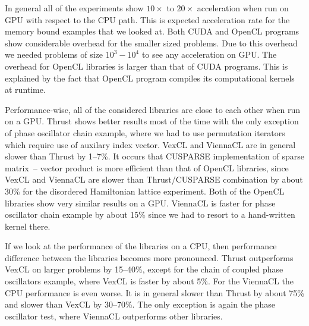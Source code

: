 \documentclass[1p]{elsarticle}
\begin{document}
In general all of the experiments show $10\times$ to $20\times$ acceleration
when run on GPU with respect to the CPU path. This is expected acceleration
rate for the memory bound examples that we looked at. Both CUDA and OpenCL
programs show considerable overhead for the smaller sized problems.  Due to
this overhead we needed problems of size $10^3-10^4$ to see any acceleration on
GPU. The overhead for OpenCL libraries is larger than that of CUDA programs.
This is explained by the fact that OpenCL program compiles its computational
kernels at runtime.

Performance-wise, all of the considered libraries are close to each other when
run on a GPU.  Thrust shows better results most of the time with the only
exception of phase oscillator chain example, where we had to use permutation
iterators which require use of auxilary index vector. VexCL and ViennaCL are in
general slower than Thrust by 1--7\%. It occurs that CUSPARSE implementation of
sparse matrix~-- vector product is more efficient than that of OpenCL
libraries, since VexCL and ViennaCL are slower than Thrust/CUSPARSE combination
by about 30\% for the disordered Hamiltonian lattice experiment. Both of the
OpenCL libraries show very similar results on a GPU.  ViennaCL is faster for
phase oscillator chain example by about 15\% since we had to resort to a
hand-written kernel there.

If we look at the performance of the libraries on a CPU, then performance
difference between the libraries becomes more pronounced. Thrust outperforms
VexCL on larger problems by 15--40\%, except for the chain of coupled phase
oscillators example, where VexCL is faster by about 5\%. For the ViennaCL the
CPU performance is even worse. It is in general slower than Thrust by about
75\%  and slower than VexCL by 30--70\%. The only exception is again the phase
oscillator test, where ViennaCL outperforms other libraries.
\end{document}
